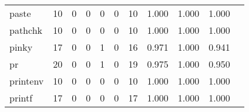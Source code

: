 \begin{longtable}{lp{1.20cm}p{1.20cm}p{1.20cm}p{1.20cm}p{1.20cm}p{1.20cm}p{1.20cm}p{1.20cm}p{1.20cm}p{1.20cm}}
paste     &                                    10 &                                                  0 &                                                  0 &                                                  0 &                                                  0 &                                                 10 &                                         1.000 &                                              1.000 &                                              1.000 \\
pathchk   &                                    10 &                                                  0 &                                                  0 &                                                  0 &                                                  0 &                                                 10 &                                         1.000 &                                              1.000 &                                              1.000 \\
pinky     &                                    17 &                                                  0 &                                                  0 &                                                  1 &                                                  0 &                                                 16 &                                         0.971 &                                              1.000 &                                              0.941 \\
pr        &                                    20 &                                                  0 &                                                  0 &                                                  1 &                                                  0 &                                                 19 &                                         0.975 &                                              1.000 &                                              0.950 \\
printenv  &                                    10 &                                                  0 &                                                  0 &                                                  0 &                                                  0 &                                                 10 &                                         1.000 &                                              1.000 &                                              1.000 \\
printf    &                                    17 &                                                  0 &                                                  0 &                                                  0 &                                                  0 &                                                 17 &                                         1.000 &                                              1.000 &                                              1.000 \\

\end{longtable}
